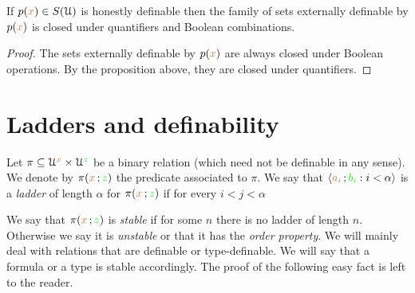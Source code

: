 \begin{corollary}
If $p({\color{brown} x})\in S(\EuScript U)$ is honestly definable then the family of sets externally definable by $p({\color{brown} x})$ is closed under quantifiers and Boolean combinations.
\end{corollary}

\begin{proof}
The sets externally definable by $p({\color{brown} x})$ are always closed under Boolean operations.
By the proposition above, they are closed under quantifiers.
\end{proof}


\section{Ladders and definability}


Let $\pi\subseteq\EuScript U^{\color{brown} x}\times\EuScript U^{\color{green} z}$ be a binary relation (which need not be definable in any sense).
We denote by $\pi({\color{brown} x}\,;{\color{green} z})$ the predicate associated to $\pi$.
We say that $\langle{\color{brown}a_i}\,;{\color{green} b_i} : i<\alpha\rangle$ is a \emph{ladder\/} of length $\alpha$ for $\pi({\color{brown} x}\,;{\color{green} z})$ if for every $i<j<\alpha$


We say that $\pi({\color{brown} x}\,;{\color{green} z})$ is \emph{stable\/} if for some $n$ there is no ladder of length $n$.
Otherwise we say it is \emph{unstable} or that it has the \emph{order property}.
We will mainly deal with relations that are definable or type-definable.
We will say that a formula or a type is stable accordingly.
The proof of the following easy fact is left to the reader.

